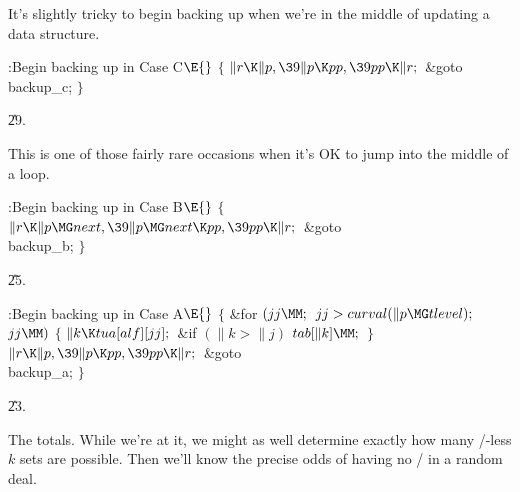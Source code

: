It's slightly tricky to begin backing up when we're in the
middle of
updating a data structure.

\Y\B\4:Begin backing up in Case C\X${}\E{}$\6
${}\{{}$\1\6
${}\|r\K\|p,\39\|p\K\\{pp},\39\\{pp}\K\|r;{}$\6
\&{goto} \\{backup\_c};\6
\4${}\}{}$\2\par
\U29.\fi

This is one of those fairly rare occasions when it's OK to
jump into the middle of a loop.

\Y\B\4:Begin backing up in Case B\X${}\E{}$\6
${}\{{}$\1\6
${}\|r\K\|p\MG\\{next},\39\|p\MG\\{next}\K\\{pp},\39\\{pp}\K\|r;{}$\6
\&{goto} \\{backup\_b};\6
\4${}\}{}$\2\par
\U25.\fi

\B{}:Begin backing up in Case A\X${}\E{}$\6
${}\{{}$\1\6
\&{for} ${}(\\{jj}\MM;{}$ ${}\\{jj}>\\{curval}(\|p\MG\\{tlevel});{}$ ${}\\{jj}%
\MM){}$\5
${}\{{}$\1\6
${}\|k\K\\{tua}[\\{alf}][\\{jj}];{}$\6
\&{if} ${}(\|k>\|j){}$\1\5
${}\\{tab}[\|k]\MM;{}$\2\6
\4${}\}{}$\2\6
${}\|r\K\|p,\39\|p\K\\{pp},\39\\{pp}\K\|r;{}$\6
\&{goto} \\{backup\_a};\6
\4${}\}{}$\2\par
\U23.\fi

The totals. While we're at it, we might as well
determine exactly
how many \SET/-less $k$ sets are possible. Then we'll know the
precise odds of having no \SET/ in a random deal.

